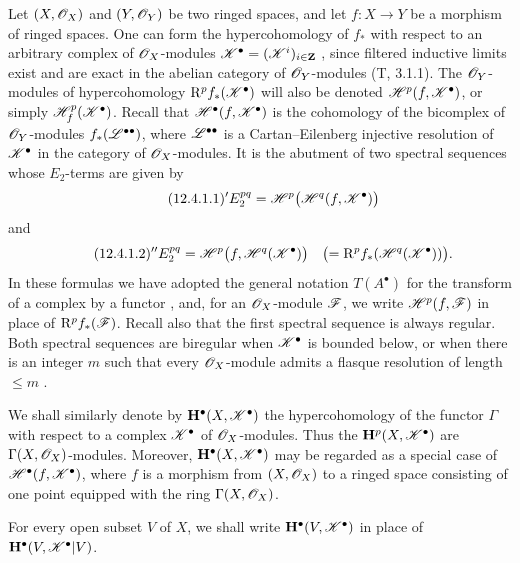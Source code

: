 \begin{env}[12.4.1]
\label{0.12.4.1}
Let $(X,\mathscr{O}_X)$ and $(Y,\mathscr{O}_Y)$ be two ringed spaces, and let
$f:X\longrightarrow Y$ be a morphism of ringed spaces.
One can form the hypercohomology of $f_*$ with respect to an arbitrary
complex of $\mathscr{O}_X$-modules
$\mathscr{K}^\bullet=(\mathscr{K}^i)_{i\in\mathbf{Z}}$
, since filtered inductive limits exist and are exact in
the abelian category of $\mathscr{O}_Y$-modules (T, 3.1.1).
The $\mathscr{O}_Y$-modules of hypercohomology
$\mathrm{R}^p f_*(\mathscr{K}^\bullet)$ will also be denoted
$\mathscr{H}^p(f,\mathscr{K}^\bullet)$, or simply
$\mathscr{H}^p_f(\mathscr{K}^\bullet)$.
Recall that $\mathscr{H}^\bullet(f,\mathscr{K}^\bullet)$ is the cohomology of
the bicomplex of $\mathscr{O}_Y$-modules $f_*(\mathscr{L}^{\bullet\bullet})$,
where $\mathscr{L}^{\bullet\bullet}$ is a Cartan--Eilenberg injective
resolution of $\mathscr{K}^\bullet$ in the category of
$\mathscr{O}_X$-modules.
It is the abutment of two spectral sequences whose $E_2$-terms are
given by
\begin{equation}
\label{0.12.4.1.1}
\tag{12.4.1.1}
  {}'E_2^{pq}
  =\mathscr{H}^p\bigl(\mathscr{H}^q(f,\mathscr{K}^\bullet)\bigr)
\end{equation}
and
\begin{equation}
\label{0.12.4.1.2}
\tag{12.4.1.2}
  {}''E_2^{pq}
  =\mathscr{H}^p\bigl(f,\mathscr{H}^q(\mathscr{K}^\bullet)\bigr)
  \quad
  \bigl(=\mathrm{R}^p f_*(\mathscr{H}^q(\mathscr{K}^\bullet))\bigr).
\end{equation}
In these formulas we have adopted the general notation $T(A^\bullet)$
for the transform of a complex by a functor , and, for
an $\mathscr{O}_X$-module $\mathscr{F}$, we write
$\mathscr{H}^p(f,\mathscr{F})$ in place of $\mathrm{R}^p f_*(\mathscr{F})$.
Recall also that the first spectral sequence is always regular.
Both spectral sequences are biregular when $\mathscr{K}^\bullet$ is
bounded below,
or when there is an integer $m$ such that every $\mathscr{O}_X$-module
admits a flasque resolution of length $\leq m$ .
\end{env}

\begin{env}[12.4.2]
\label{0.12.4.2}
We shall similarly denote by $\mathbf{H}^\bullet(X,\mathscr{K}^\bullet)$ the
hypercohomology of the functor $\Gamma$ with respect to a complex
$\mathscr{K}^\bullet$ of $\mathscr{O}_X$-modules.
Thus the $\mathbf{H}^p(X,\mathscr{K}^\bullet)$ are
$\Gamma(X,\mathscr{O}_X)$-modules.
Moreover, $\mathbf{H}^\bullet(X,\mathscr{K}^\bullet)$ may be regarded as a
special case of $\mathscr{H}^\bullet(f,\mathscr{K}^\bullet)$, where $f$ is a
morphism from $(X,\mathscr{O}_X)$ to a ringed space consisting of one point
equipped with the ring $\Gamma(X,\mathscr{O}_X)$.

For every open subset $V$ of $X$, we shall write
$\mathbf{H}^\bullet(V,\mathscr{K}^\bullet)$ in place of
$\mathbf{H}^\bullet(V,\mathscr{K}^\bullet|V)$.
\end{env}

